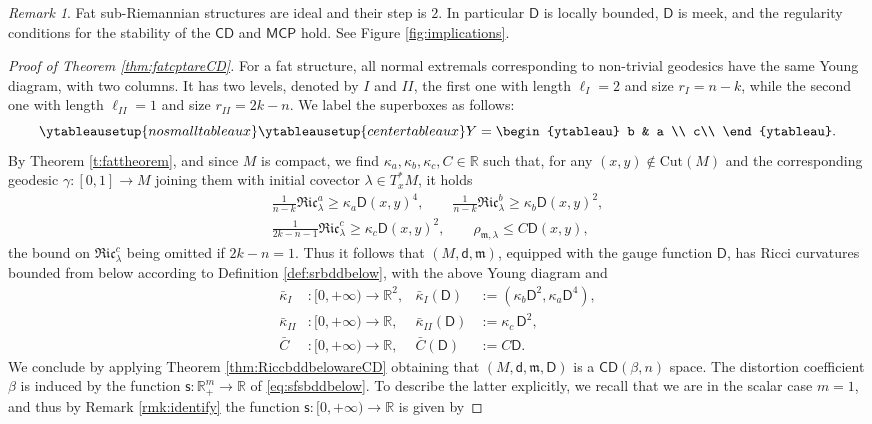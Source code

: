 \documentclass[11pt,a4paper]{article}
\theoremstyle{plain}
\theoremstyle{definition}
\theoremstyle{remark}
\newtheorem{remark}[theorem]{Remark}
\numberwithin{equation}{section}
\newcommand{\R}{\mathbb{R}} %
\newcommand{\Cut}{\mathrm{Cut}}
\newcommand{\CD}{\mathsf{CD}}
\newcommand{\MCP}{\mathsf{MCP}}
\newcommand{\sfs}{\mathsf{s}}
\newcommand{\mm}{\mathfrak m}
\newcommand{\sfd}{\mathsf d}
\newcommand{\sfD}{\mathsf D}
\begin{document}
\begin{remark} 
Fat sub-Riemannian structures are ideal and their step is $2$. In particular $\sfD$ is locally bounded, $\sfD$ is meek, and the regularity conditions for the stability of the $\CD$ and $\MCP$ hold. See Figure \ref{fig:implications}.
\end{remark}
\begin{proof}[Proof of Theorem \ref{thm:fatcptareCD}]
For a fat structure, all normal extremals corresponding to non-trivial geodesics have the same Young diagram, with two columns. It has two levels, denoted by $I$ and $II$, the first one with length $\ell_{I}=2$ and size $r_{I} = n-k$, while the second one with length $\ell_{II}=1$ and size $r_{II}=2k-n$. We label the superboxes as follows:
\begin{equation}
\ytableausetup{nosmalltableaux}
\ytableausetup{centertableaux}
Y = \begin{ytableau}
b & a \\
c\\
\end{ytableau}.
\end{equation}
By Theorem \ref{t:fattheorem}, and since $M$ is compact, we find $\kappa_a,\kappa_b,\kappa_c, C\in \R$ such that, for any $(x,y)\notin \Cut(M)$ and the corresponding geodesic $\gamma:[0,1]\to M$ joining them with initial covector $\lambda \in T^*_x M$, it holds
\begin{gather}
\frac{1}{n-k}\mathfrak{Ric}_{\lambda}^a  \geq \kappa_a \sfD(x,y)^4, \qquad  \frac{1}{n-k}\mathfrak{Ric}^{b}_\lambda \geq \kappa_b \sfD(x,y)^2, \\
\frac{1}{2k-n-1} \mathfrak{Ric}_{\lambda}^c  \geq \kappa_c \sfD(x,y)^2, \qquad \rho_{\mm,\lambda} \leq C \sfD(x,y),
\end{gather}
the bound on $\mathfrak{Ric}_{\lambda}^c$ being omitted if $2k-n=1$. Thus it follows that $(M,\sfd,\mm)$, equipped with the gauge function $\sfD$, has Ricci curvatures bounded from below according to Definition \ref{def:srbddbelow}, with the above Young diagram and
\begin{align}
\bar{\kappa}_I & : [0,+\infty) \to \R^2, &  \bar{\kappa}_I(\sfD)  & := (\kappa_b\sfD^2,\kappa_a \sfD^4),\\
\bar{\kappa}_{II} & : [0,+\infty) \to \R, & \bar{\kappa}_{II}(\sfD) & := \kappa_c\, \sfD^2,\\
\bar{C} & : [0,+\infty) \to \R, & \bar{C}(\sfD) & := C \sfD.
\end{align}
We conclude by applying Theorem \ref{thm:RiccbddbelowareCD} obtaining that $(M,\sfd,\mm,\sfD)$ is a $\CD(\beta,n)$ space. The distortion coefficient $\beta$ is induced by the function $\sfs :\R^m_+ \to \R$ of \eqref{eq:sfsbddbelow}. To describe the latter explicitly, we recall that we are in the scalar case $m=1$, and thus by Remark \ref{rmk:identify} the function $\sfs : [0,+\infty) \to \R$ is given by

\end{proof}
\end{document}
